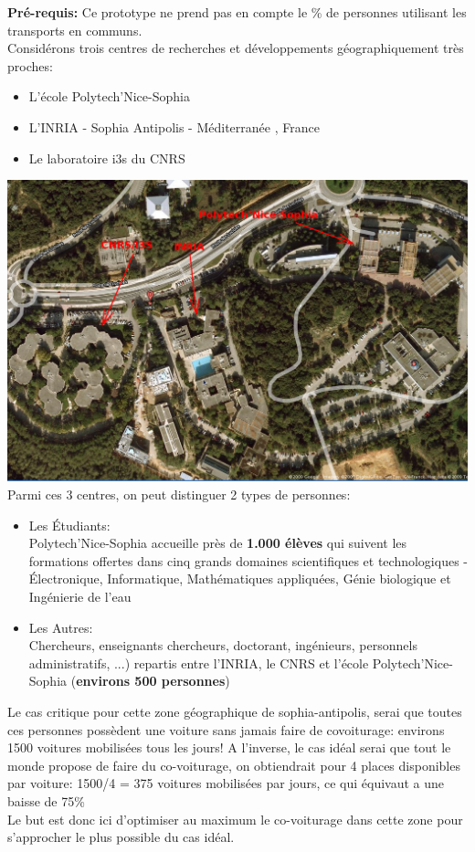 \textbf{Pré-requis:} Ce prototype ne prend pas en compte le \% de personnes utilisant les transports en communs.\\

Considérons trois centres de recherches et développements géographiquement très proches:
\begin{itemize}
\item L'école Polytech'Nice-Sophia
\item L'INRIA - Sophia Antipolis - Méditerranée , France
\item Le laboratoire i3s du CNRS \\
\end{itemize}

\includegraphics[scale=0.35]{img/screenshot/geolock} \\

Parmi ces 3 centres, on peut distinguer 2 types de personnes:
\begin{itemize}
\item Les Étudiants: \\
	Polytech'Nice-Sophia accueille près de \textbf{1.000 élèves} qui suivent les formations offertes dans cinq grands domaines scientifiques et technologiques  - Électronique, Informatique, Mathématiques appliquées, Génie biologique et Ingénierie de l'eau
\item Les Autres: \\
	Chercheurs, enseignants chercheurs, doctorant, ingénieurs, personnels administratifs, ...)
	repartis entre l'INRIA, le CNRS et l'école Polytech'Nice-Sophia (\textbf{environs 500 personnes}) \\
\end{itemize} 

Le cas critique pour cette zone géographique de sophia-antipolis, serai que toutes ces personnes possèdent une voiture sans jamais faire de covoiturage: environs 1500 voitures mobilisées tous les jours!
A l'inverse, le cas idéal serai que tout le monde propose de faire du co-voiturage, on obtiendrait pour 4 places disponibles par voiture:
1500/4 = 375 voitures mobilisées par jours, ce qui équivaut a une baisse de 75\% \\

Le but est donc ici d'optimiser au maximum le co-voiturage dans cette zone pour s'approcher le plus possible du cas idéal. 




